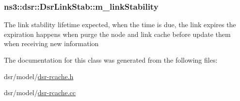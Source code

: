 \subsubsection[{\texorpdfstring{m\+\_\+link\+Stability}{m_linkStability}}]{ ns3\+::dsr\+::\+Dsr\+Link\+Stab\+::m\+\_\+link\+Stability\hspace{0.3cm}{\ttfamily [private]}}\hypertarget{classns3_1_1dsr_1_1DsrLinkStab_a8628cc9bb3c2513864db8261ff622adf}{}\label{classns3_1_1dsr_1_1DsrLinkStab_a8628cc9bb3c2513864db8261ff622adf}
The link stability lifetime expected, when the time is due, the link expires the expiration happens when purge the node and link cache before update them when receiving new information 

The documentation for this class was generated from the following files\+:\begin{DoxyCompactItemize}
\item 
dsr/model/\hyperlink{dsr-rcache_8h}{dsr-\/rcache.\+h}\item 
dsr/model/\hyperlink{dsr-rcache_8cc}{dsr-\/rcache.\+cc}\end{DoxyCompactItemize}
